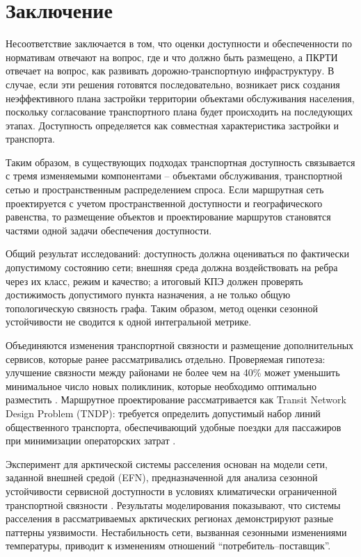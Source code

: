 \chapter*{Заключение}

Несоответствие заключается в том, что оценки доступности и обеспеченности по нормативам отвечают на вопрос, где и что должно быть размещено, а ПКРТИ отвечает на вопрос, как развивать дорожно-транспортную инфраструктуру. В случае, если эти решения готовятся последовательно, возникает риск создания неэффективного плана застройки территории объектами обслуживания населения, поскольку согласование транспортного плана будет происходить на последующих этапах. Доступность определяется как совместная характеристика застройки и транспорта.

Таким образом, в существующих подходах транспортная доступность связывается с тремя изменяемыми компонентами -- объектами обслуживания, транспортной сетью и пространственным распределением спроса. Если маршрутная сеть проектируется с учетом пространственной доступности и географического равенства, то размещение объектов и проектирование маршрутов становятся частями одной задачи обеспечения доступности.

Общий результат исследований: доступность должна оцениваться по фактически допустимому состоянию сети; внешняя среда должна воздействовать на ребра через их класс, режим и качество; а итоговый КПЭ должен проверять достижимость допустимого пункта назначения, а не только общую топологическую связность графа. Таким образом, метод оценки сезонной устойчивости не сводится к одной интегральной метрике.

Объединяются изменения транспортной связности и размещение дополнительных сервисов, которые ранее рассматривались отдельно. Проверяемая гипотеза: улучшение связности между районами не более чем на 40\% может уменьшить минимальное число новых поликлиник, которые необходимо оптимально разместить \cite{kontsevik2024connectivityPlacement}. Маршрутное проектирование рассматривается как Transit Network Design Problem (TNDP): требуется определить допустимый набор линий общественного транспорта, обеспечивающий удобные поездки для пассажиров при минимизации операторских затрат \cite{mandl1980tndp,duranMicco2022tndpReview,sahin2023linePlanning,morozov2026oneRuleTndp}.

Эксперимент для арктической системы расселения основан на модели сети, заданной внешней средой (EFN), предназначенной для анализа сезонной устойчивости сервисной доступности в условиях климатически ограниченной транспортной связности \cite{mineEnvironmentFramedNetworks2026}. Результаты моделирования показывают, что системы расселения в рассматриваемых арктических регионах демонстрируют разные паттерны уязвимости. Нестабильность сети, вызванная сезонными изменениями температуры, приводит к изменениям отношений ``потребитель--поставщик''.


